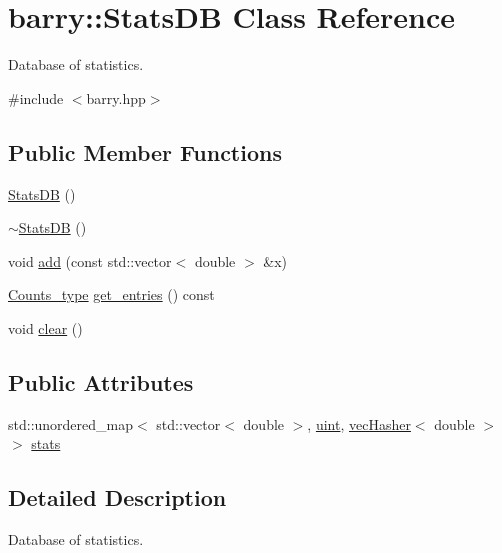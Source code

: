 \hypertarget{classbarry_1_1_stats_d_b}{}\section{barry\+:\+:Stats\+DB Class Reference}
\label{classbarry_1_1_stats_d_b}


Database of statistics.  




{\ttfamily \#include $<$barry.\+hpp$>$}

\subsection*{Public Member Functions}
\begin{DoxyCompactItemize}
\item 
\hyperlink{classbarry_1_1_stats_d_b_a917ba8ccacb9dce050c481eb8a6d3c22}{Stats\+DB} ()
\item 
\hyperlink{classbarry_1_1_stats_d_b_a7d511a6eeeae101e18ae47ca616ad204}{$\sim$\+Stats\+DB} ()
\item 
void \hyperlink{classbarry_1_1_stats_d_b_a8f2d22df8ecf8f12bc54157e86d34696}{add} (const std\+::vector$<$ double $>$ \&x)
\item 
\hyperlink{namespacebarry_a3e2d8c3b6cf602107559d4237d9f1315}{Counts\+\_\+type} \hyperlink{classbarry_1_1_stats_d_b_a396e0921c34a854320a8027ce0f29278}{get\+\_\+entries} () const
\item 
void \hyperlink{classbarry_1_1_stats_d_b_a5de68def55b0a3b99a8f609815624a00}{clear} ()
\end{DoxyCompactItemize}
\subsection*{Public Attributes}
\begin{DoxyCompactItemize}
\item 
std\+::unordered\+\_\+map$<$ std\+::vector$<$ double $>$, \hyperlink{namespacebarry_a11dfc53ddb4672278319aa04f1e09a6c}{uint}, \hyperlink{structbarry_1_1vec_hasher}{vec\+Hasher}$<$ double $>$ $>$ \hyperlink{classbarry_1_1_stats_d_b_a37af92a5d40cd2582446d86209ea7f26}{stats}
\end{DoxyCompactItemize}


\subsection{Detailed Description}
Database of statistics. 

